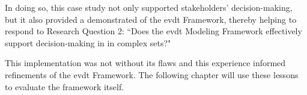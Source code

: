 In doing so, this case study not only supported stakeholders' decision-making, but it also provided a demonstrated of the \ac{evdt} Framework, thereby helping to respond to Research Question 2: ``Does the \ac{evdt} Modeling Framework effectively support decision-making in in complex \ac{sets}?"

This implementation was not without its flaws and this experience informed refinements of the \ac{evdt} Framework. The following chapter will use these lessons to evaluate the framework itself.

